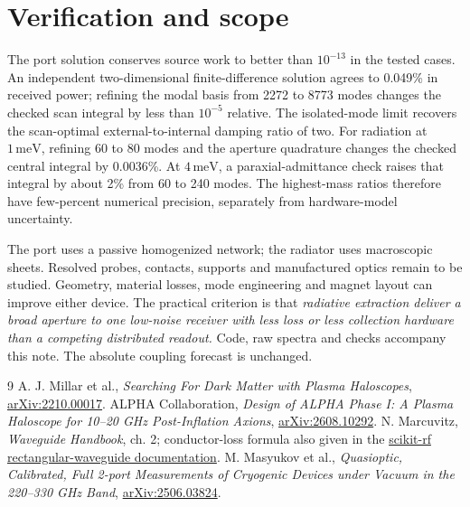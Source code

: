 \documentclass[10pt]{article}
\newcommand{\meV}{\,\mathrm{meV}}
\begin{document}
\section{Verification and scope}
The port solution conserves source work to better than $10^{-13}$ in the tested cases. An independent two-dimensional finite-difference solution agrees to 0.049\% in received power; refining the modal basis from 2272 to 8773 modes changes the checked scan integral by less than $10^{-5}$ relative. The isolated-mode limit recovers the scan-optimal external-to-internal damping ratio of two. For radiation at $1\meV$, refining 60 to 80 modes and the aperture quadrature changes the checked central integral by 0.0036\%. At $4\meV$, a paraxial-admittance check raises that integral by about 2\% from 60 to 240 modes. The highest-mass ratios therefore have few-percent numerical precision, separately from hardware-model uncertainty.

The port uses a passive homogenized network; the radiator uses macroscopic sheets. Resolved probes, contacts, supports and manufactured optics remain to be studied. Geometry, material losses, mode engineering and magnet layout can improve either device. The practical criterion is that \emph{radiative extraction deliver a broad aperture to one low-noise receiver with less loss or less collection hardware than a competing distributed readout.} Code, raw spectra and checks accompany this note. The absolute coupling forecast is unchanged.

\begin{thebibliography}{9}\small
{} A. J. Millar et al., \emph{Searching For Dark Matter with Plasma Haloscopes}, \href{https://arxiv.org/abs/2210.00017}{arXiv:2210.00017}.
 ALPHA Collaboration, \emph{Design of ALPHA Phase I: A Plasma Haloscope for 10--20 GHz Post-Inflation Axions}, \href{https://arxiv.org/abs/2608.10292}{arXiv:2608.10292}.
 N. Marcuvitz, \emph{Waveguide Handbook}, ch. 2; conductor-loss formula also given in the \href{https://scikit-rf-official.readthedocs.io/en/v2.1.0/api/media/generated/skrf.media.rectangularWaveguide.RectangularWaveguide.alpha_c.html}{scikit-rf rectangular-waveguide documentation}.
 M. Masyukov et al., \emph{Quasioptic, Calibrated, Full 2-port Measurements of Cryogenic Devices under Vacuum in the 220--330 GHz Band}, \href{https://arxiv.org/abs/2506.03824}{arXiv:2506.03824}.
\end{thebibliography}
\end{document}
